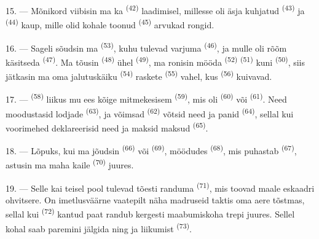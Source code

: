 15. --- Mõnikord viibisin ma ka  \textsuperscript{(42)} laadimisel,
millesse oli äsja kuhjatud  \textsuperscript{(43)} ja 
\textsuperscript{(44)} kaup, mille olid kohale toonud 
\textsuperscript{(45)} arvukad rongid.

\VUsaut{3.0mm}
\VUsaut{3.0mm}

16. --- Sageli sõudsin ma  \textsuperscript{(53)}, kuhu tulevad varjuma
 \textsuperscript{(46)}, ja mulle oli rõõm käsitseda 
\textsuperscript{(47)}. Ma tõusin  \textsuperscript{(48)} ühel
 \textsuperscript{(49)}, ma ronisin mööda 
\textsuperscript{(52)}  \textsuperscript{(51)} kuni 
\textsuperscript{(50)}, siis jätkasin ma oma jalutuskäiku 
\textsuperscript{(54)} raskete  \textsuperscript{(55)} vahel, kus
 \textsuperscript{(56)} kuivavad.

17. ---  \textsuperscript{(58)} liikus mu ees kõige mitmekesisem
 \textsuperscript{(59)}, mis oli  \textsuperscript{(60)} või
 \textsuperscript{(61)}. Need moodustasid lodjade 
\textsuperscript{(63)}, ja võimsad  \textsuperscript{(62)} võtsid need ja
panid  \textsuperscript{(64)}, sellal kui voorimehed deklareerisid
need ja maksid maksud  \textsuperscript{(65)}.

18. --- Lõpuks, kui ma jõudsin  \textsuperscript{(66)} või
 \textsuperscript{(69)}, möödudes 
\textsuperscript{(68)}, mis puhastab  \textsuperscript{(67)}, astusin ma
maha kaile  \textsuperscript{(70)} juures.

19. --- Selle kai teisel pool tulevad tõesti randuma 
\textsuperscript{(71)}, mis toovad maale eskaadri ohvitsere. On imetlusväärne vaatepilt
näha madruseid taktis oma aere tõstmas, sellal kui  \textsuperscript{(72)}
kantud paat randub kergesti maabumiskoha trepi juures. Sellel kohal saab paremini
jälgida  ning  ja  liikumist 
\textsuperscript{(73)}.

\VUsaut{3.0mm}
\VUsaut{3.0mm}

